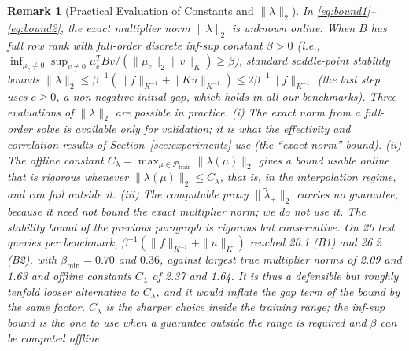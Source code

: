 \documentclass[11pt,a4paper]{article}
\newtheorem{remark}{Remark}
\begin{document}
\begin{remark}[Practical Evaluation of Constants and $\|\lambda\|_2$]

In \eqref{eq:bound1}--\eqref{eq:bound2}, the exact multiplier norm \(\|\lambda\|_2\) is unknown online. When \(B\) has full row rank with full-order discrete inf-sup constant \(\beta > 0\) (i.e., \(\inf_{\mu_c \neq 0} \sup_{v \neq 0} \mu_c^T B v / (\|\mu_c\|_2 \|v\|_K) \ge \beta\)), standard saddle-point stability \cite{brezzi1991mixed, hild2007residual, franceschini2022block} bounds \(\|\lambda\|_2 \le \beta^{-1} (\|f\|_{K^{-1}} + \|K u\|_{K^{-1}}) \le 2 \beta^{-1} \|f\|_{K^{-1}}\) (the last step uses \(c \ge 0\), a non-negative initial gap, which holds in all our benchmarks). Three evaluations of \(\|\lambda\|_2\) are possible in practice. (i) The exact norm from a full-order solve is available only for validation; it is what the effectivity and correlation results of Section~\ref{sec:experiments} use (the ``exact-norm'' bound). (ii) The offline constant \(C_\lambda = \max_{\mu \in \mathcal{P}_{\mathrm{train}}} \|\lambda(\mu)\|_2\) gives a bound usable online that is rigorous whenever \(\|\lambda(\mu)\|_2 \le C_\lambda\), that is, in the interpolation regime, and can fail outside it. (iii) The computable proxy \(\|\tilde{\lambda}_+\|_2\) carries no guarantee, because it need not bound the exact multiplier norm; we do not use it. The stability bound of the previous paragraph is rigorous but conservative. On 20 test queries per benchmark, \(\beta^{-1}(\|f\|_{K^{-1}} + \|u\|_K)\) reached 20.1 (B1) and 26.2 (B2), with \(\beta_{\min} = 0.70\) and \(0.36\), against largest true multiplier norms of 2.09 and 1.63 and offline constants \(C_\lambda\) of 2.37 and 1.64. It is thus a defensible but roughly tenfold looser alternative to \(C_\lambda\), and it would inflate the gap term of the bound by the same factor. \(C_\lambda\) is the sharper choice inside the training range; the inf-sup bound is the one to use when a guarantee outside the range is required and \(\beta\) can be computed offline.
\end{remark}
\end{document}
